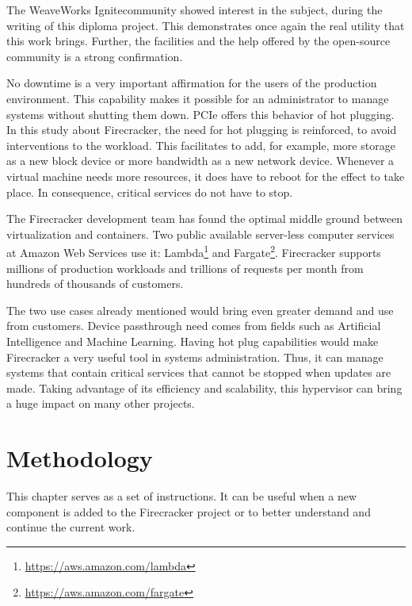 \documentclass[12pt, a4paper]{report}
\begin{document}
The WeaveWorks Ignite\footnotemark community showed interest in the subject, during the writing of this diploma project. This demonstrates once again the real utility that this work brings. Further, the facilities and the help offered by the open-source community is a strong confirmation.

No downtime is a very important affirmation for the users of the production environment. This capability makes it possible for an administrator to manage systems without shutting them down. PCIe offers this behavior of hot plugging. In this {study}\cite{firecracker_study} about Firecracker, the need for hot plugging is reinforced, to avoid interventions to the workload. This facilitates to add, for example, more storage as a new block device or more bandwidth as a new network device. Whenever a virtual machine needs more resources, it does have to reboot for the effect to take place. In consequence, critical services do not have to stop.

The Firecracker development team has found the optimal middle ground between virtualization and containers. Two public available server-less computer services at Amazon Web Services use it: Lambda\footnote{\url{https://aws.amazon.com/lambda}} and Fargate\footnote{\url{https://aws.amazon.com/fargate}}. Firecracker supports millions of production workloads and trillions of requests per month from hundreds of thousands of customers\footnotemark.

The two use cases already mentioned would bring even greater demand and use from customers. Device passthrough need comes from fields such as Artificial Intelligence and Machine Learning. Having hot plug capabilities would make Firecracker a very useful tool in systems administration. Thus, it can manage systems that contain critical services that cannot be stopped when updates are made. Taking advantage of its efficiency and scalability, this hypervisor can bring a huge impact on many other projects.


\chapter{Methodology}\label{Methodology}

This chapter serves as a set of instructions. It can be useful when a new component is added to the Firecracker project or to better understand and continue the current work.
\end{document}
